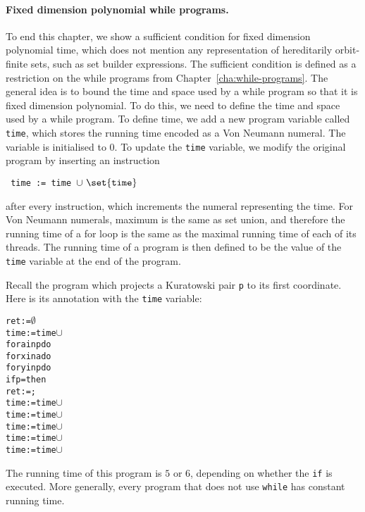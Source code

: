 \paragraph*{Fixed dimension polynomial while programs.} To end this chapter, we show a sufficient condition for fixed dimension polynomial time, which does not mention any representation of hereditarily orbit-finite sets, such as set builder expressions. The sufficient condition is defined as a restriction on the while programs from Chapter~\ref{cha:while-programs}. The general idea is to bound the time and space used by a while program so that it is fixed dimension polynomial. To do this, we need to define the time and space used by a while program. To define time, we add a new program variable called {\tt time}, which stores the running time encoded as a Von Neumann numeral. The variable is initialised to $0$. To update the {\tt time} variable, we modify the original program by inserting an instruction
\begin{center}
 \tt{ time := time }$\cup\ \set{\mathtt{time}}$
\end{center}
after every instruction, which
 increments the numeral representing the time. For Von Neumann numerals, maximum is the same as set union, and therefore the running time of a for loop is the same as the maximal running time of each of its threads. The running time of a program is then defined to be the value of the {\tt time} variable at the end of the program. 

\begin{myexample}
 Recall the program which projects a Kuratowski pair {\tt p} to its first coordinate.
Here is its annotation with the {\tt time} variable:
\begin{alltt}
    ret := \ensuremath{\emptyset}
    time := time \ensuremath{\cup} 
    for a in p do 
      for x in a do 
        for y in p do 
          if p =  then	
            ret:=;
            time := time \ensuremath{\cup} 
          time := time \ensuremath{\cup} 
        time := time \ensuremath{\cup} 
      time := time \ensuremath{\cup} 
    time := time \ensuremath{\cup} 
    \end{alltt}

 The running time of this program is $5$ or $6$, depending on whether the {\tt if} is executed. More generally, every program that does not use {\tt while} has constant running time. 
\end{myexample}

